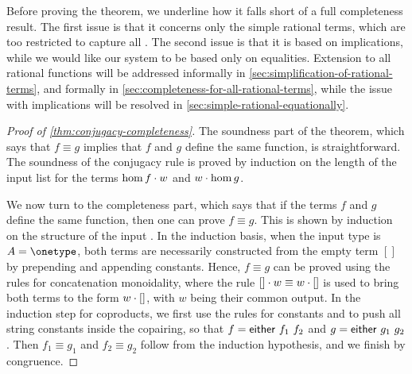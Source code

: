 
Before proving the theorem, we underline how it falls short of a full completeness result. The first issue is that it concerns only the simple rational terms, which are too restricted to capture all . The second issue is that it is based on implications, while we would like our system to be based only on equalities. Extension to all rational functions will be addressed informally in \cref{sec:simplification-of-rational-terms}, and formally in \cref{sec:completeness-for-all-rational-terms}, while the issue with implications will be resolved in \cref{sec:simple-rational-equationally}.

\begin{proof}[Proof of \cref{thm:conjugacy-completeness}]
    The soundness part of the theorem, which says that $f \equiv g$ implies that $f$ and $g$ define the same function, is straightforward. The soundness of the conjugacy rule is proved by induction on the length of the input list for the terms $\hom f \cdot w$ and $w \cdot \hom g$.
    
    We now turn to the completeness part, which says that if the terms $f$ and $g$ define the same function, then one can prove $f \equiv g$. This is shown by induction on the structure of the input . In the induction basis, when the input type is $A = \onetype$, both terms are necessarily constructed from the empty term $[]$ by prepending and appending constants. Hence, $f \equiv g$ can be proved using the rules for concatenation monoidality, where the rule $[] \cdot w \equiv w \cdot []$ is used to bring both terms to the form $w \cdot []$, with $w$ being their common output. In the induction step for coproducts, we first use the rules for constants and  to push all string constants inside the copairing, so that $f = \mathsf{either}\ f_1\ f_2$ and $g = \mathsf{either}\ g_1\ g_2$. Then $f_1 \equiv g_1$ and $f_2 \equiv g_2$ follow from the induction hypothesis, and we finish by congruence.
    

\end{proof}
